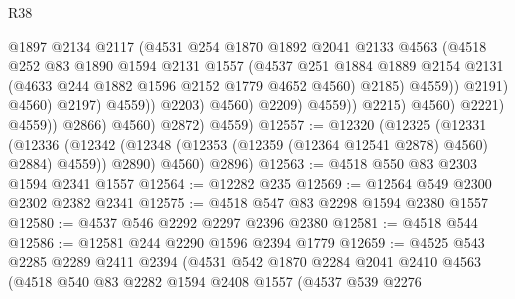 \begin{lexlean}{R38}
\begin{coremodule}
                                          @1897
                                          @2134
                                          @2117
                                          (@4531
                                            @254
                                            @1870
                                            @1892
                                            @2041
                                            @2133
                                            @4563
                                            (@4518
                                              @252
                                              @83
                                              @1890
                                              @1594
                                              @2131
                                              @1557
                                              (@4537
                                                @251
                                                @1884
                                                @1889
                                                @2154
                                                @2131
                                                (@4633 @244 @1882 @1596 @2152 @1779 @4652 @4560)
                                                @2185)
                                              @4559))
                                          @2191)
                                        @4560)
                                      @2197)
                                    @4559))
                                @2203)
                              @4560)
                            @2209)
                          @4559))
                      @2215)
                    @4560)
                  @2221)
                @4559))
            @2866)
          @4560)
        @2872)
      @4559)
@12557 := @12320
    (@12325
      (@12331
        (@12336 (@12342 (@12348 (@12353 (@12359 (@12364 @12541 @2878) @4560) @2884) @4559)) @2890)
        @4560)
      @2896)
@12563 := @4518 @550 @83 @2303 @1594 @2341 @1557
@12564 := @12282 @235
@12569 := @12564 @549 @2300 @2302 @2382 @2341
@12575 := @4518 @547 @83 @2298 @1594 @2380 @1557
@12580 := @4537 @546 @2292 @2297 @2396 @2380
@12581 := @4518 @544
@12586 := @12581 @244 @2290 @1596 @2394 @1779
@12659 := @4525
    @543
    @2285
    @2289
    @2411
    @2394
    (@4531
      @542
      @1870
      @2284
      @2041
      @2410
      @4563
      (@4518
        @540
        @83
        @2282
        @1594
        @2408
        @1557
        (@4537
          @539
          @2276

\end{coremodule}
\end{lexlean}
